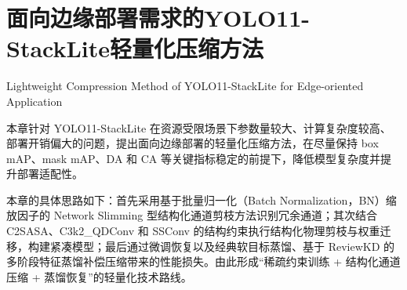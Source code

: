 \chapter{面向边缘部署需求的YOLO11-StackLite轻量化压缩方法}{Lightweight Compression Method of YOLO11-StackLite for Edge-oriented Application}

本章针对 YOLO11-StackLite 在资源受限场景下参数量较大、计算复杂度较高、部署开销偏大的问题，提出面向边缘部署的轻量化压缩方法，在尽量保持 box mAP、mask mAP、DA 和 CA 等关键指标稳定的前提下，降低模型复杂度并提升部署适配性。

本章的具体思路如下：首先采用基于批量归一化（Batch Normalization，BN）缩放因子的 Network Slimming 型结构化通道剪枝方法识别冗余通道\cite{liu2017networkslimming,he2017channelpruning,luo2017thinet}；其次结合 C2SASA、C3k2\_QDConv 和 SSConv 的结构约束执行结构化物理剪枝与权重迁移，构建紧凑模型；最后通过微调恢复以及经典软目标蒸馏、基于 ReviewKD 的多阶段特征蒸馏补偿压缩带来的性能损失\cite{hinton2015distilling,chen2021reviewkd}。由此形成“稀疏约束训练 + 结构化通道压缩 + 蒸馏恢复”的轻量化技术路线。

